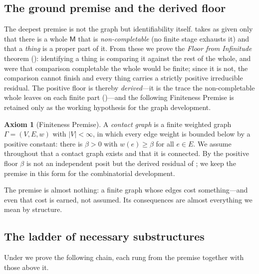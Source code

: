 \documentclass[11pt,a4paper]{article}
\theoremstyle{thmstyle}
\theoremstyle{definition}
\newtheorem{axiom}{Axiom}
\theoremstyle{remark}
\newcommand{\Gph}{\Gamma}                 %
\newcommand{\V}{V}                        %
\newcommand{\E}{E}                        %
\newcommand{\wt}{w}                       %
\newcommand{\floorc}{\beta}               %
\newcommand{\med}{\mathsf{M}}             %
\newcommand{\abs}[1]{\lvert#1\rvert}
\begin{document}
\subsection{The ground premise and the derived floor}

The deepest premise is not the graph but identifiability itself. 
takes as given only that there is a whole $\med$ that is \emph{non-completable}
(no finite stage exhausts it) and that a \emph{thing} is a proper part of it. From
these we prove the \emph{Floor from Infinitude} theorem
(): identifying a thing is comparing it against the
rest of the whole, and were that comparison completable the whole would be
finite; since it is not, the comparison cannot finish and every thing carries a
strictly positive irreducible residual. The positive floor is thereby
\emph{derived}---it is the trace the non-completable whole leaves on each finite
part ()---and the following Finiteness Premise is retained
only as the working hypothesis for the graph development.

\begin{axiom}[Finiteness Premise]
\label{ax:finite}
A \emph{contact graph} is a finite weighted graph $\Gph=(\V,\E,\wt)$ with
$\abs{\V}<\infty$, in which every edge weight is bounded below by a positive
constant: there is $\floorc>0$ with $\wt(e)\ge\floorc$ for all $e\in\E$. We
assume throughout that a contact graph exists and that it is connected. By
 the positive floor $\floorc$ is not an independent
posit but the derived residual of ; we keep the
premise in this form for the combinatorial development.
\end{axiom}

The premise is almost nothing: a finite graph whose edges cost something---and
even that cost is earned, not assumed. Its consequences are almost everything we
mean by structure.

\subsection{The ladder of necessary substructures}

Under  we prove the following chain, each rung from the premise
together with those above it.
\end{document}
